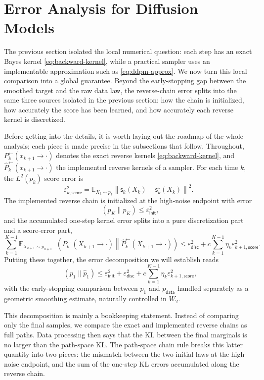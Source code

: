 \documentclass[10pt,a4paper]{amsart}
\numberwithin{equation}{section}
\DeclareMathOperator{\KL}{D_{\mathsf{KL}}}
\newcommand{\E}{\mathbb{E}}
\newcommand{\wh}[1]{\widehat{#1}}
\newcommand{\eps}{\varepsilon}
\newcommand{\norm}[1]{\left\lVert #1 \right\rVert}
\newcommand{\pdata}{p_{\mathsf{data}}}
\newcommand{\sstar}{\mathsf{s}^{\star}}
\newcommand{\score}{\mathsf{s}}
\newcommand{\epsinit}{\varepsilon_{\mathsf{init}}}
\newcommand{\epsdisc}{\varepsilon_{\mathsf{disc}}}
\newcommand{\epsscorek}{\varepsilon_{k,\mathsf{score}}}
\begin{document}
\section{Error Analysis for Diffusion Models}
\label{sec:error-analysis}

The previous section isolated the local numerical question: each step has an
exact Bayes kernel \eqref{eq:backward-kernel}, while a practical sampler uses an
implementable approximation such as \eqref{eq:ddpm-approx}.  We now turn this
local comparison into a global guarantee.  Beyond the early-stopping gap between
the smoothed target and the raw data law, the reverse-chain error splits into
the same three sources isolated in the previous section: how the chain is
initialized, how accurately the score has been learned, and how accurately each
reverse kernel is discretized.

Before getting into the details, it is worth laying out the roadmap of the whole analysis; each piece is made precise in the subsections that
follow.  Throughout, $P_k^{\leftarrow}(x_{k+1} \to \cdot)$ denotes the exact
reverse kernels \eqref{eq:backward-kernel}, and
$\wh P_k^{\leftarrow}(x_{k+1} \to \cdot)$ the implemented reverse kernels of a
sampler.  For each time $k$, the $L^2(p_k)$ score error is
\begin{equation}\label{eq:score-error}
    \epsscorek^2
    =
    \E_{X_k\sim p_k}
    \norm{\score_k(X_k)-\sstar_k(X_k)}^2.
\end{equation}
The implemented reverse chain is initialized at the high-noise endpoint with
error
\[
    \KL(p_K\|\wh p_K)\leq \epsinit^2,
\]
and the accumulated one-step kernel error splits into a pure discretization part
and a score-error part,
\[
    \sum_{k=1}^{K-1}
    \E_{X_{k+1}\sim p_{k+1}}
    \KL\!\left(
        P_k^{\leftarrow}(X_{k+1} \to \cdot)
        \middle\|
        \wh P_k^{\leftarrow}(X_{k+1} \to \cdot)
    \right)
    \leq
    \epsdisc^2
    +
    c\sum_{k=1}^{K-1}\eta_k\eps_{k+1,\mathsf{score}}^2.
\]
Putting these together, the error decomposition we will establish reads
\begin{equation}\label{eq:ddpm-error-decomposition}
    \KL(p_1\|\wh p_1)
    \leq
    \epsinit^2
    +
    \epsdisc^2
    +
    c\sum_{k=1}^{K-1}\eta_k\eps_{k+1,\mathsf{score}}^2,
\end{equation}
with the early-stopping comparison between $p_1$ and $\pdata$ handled separately
as a geometric smoothing estimate, naturally controlled in $W_2$.

This decomposition is mainly a bookkeeping statement.  Instead of comparing only the
final samples, we compare the exact and implemented reverse chains as full
paths.  Data processing then says that the KL between the final marginals is no
larger than the path-space KL\@.  The path-space chain rule breaks this latter
quantity into two pieces: the mismatch between the two initial laws at the
high-noise endpoint, and the sum of the one-step KL errors accumulated along the
reverse chain.
\end{document}

